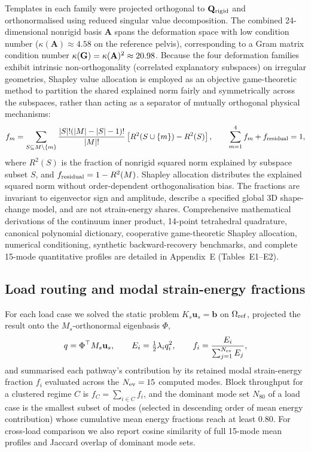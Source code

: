 \documentclass[11pt]{article}
\begin{document}
Templates in each family were projected orthogonal to $\mathbf Q_{\rm rigid}$ and orthonormalised using reduced singular value decomposition.
The combined 24-dimensional nonrigid basis $\mathbf A$ spans the deformation space with low condition number ($\kappa(\mathbf A) \approx 4.58$ on the reference pelvis), corresponding to a Gram matrix condition number $\kappa(\mathbf G) = \kappa(\mathbf A)^2 \approx 20.98$.
Because the four deformation families exhibit intrinsic non-orthogonality (correlated explanatory subspaces) on irregular geometries, Shapley value allocation is employed as an objective game-theoretic method to partition the shared explained norm fairly and symmetrically across the subspaces, rather than acting as a separator of mutually orthogonal physical mechanisms:
\begin{equation}
f_m = \sum_{S \subseteq M \setminus \{m\}} \frac{|S|!(|M|-|S|-1)!}{|M|!} \left[ R^2(S \cup \{m\}) - R^2(S) \right], \qquad
\sum_{m=1}^4 f_m + f_{\rm residual} = 1,
\end{equation}
where $R^2(S)$ is the fraction of nonrigid squared norm explained by subspace subset $S$, and $f_{\rm residual} = 1 - R^2(M)$.
Shapley allocation distributes the explained squared norm without order-dependent orthogonalisation bias.
The fractions are invariant to eigenvector sign and amplitude, describe a specified global 3D shape-change model, and are not strain-energy shares.
Comprehensive mathematical derivations of the continuum inner product, 14-point tetrahedral quadrature, canonical polynomial dictionary, cooperative game-theoretic Shapley allocation, numerical conditioning, synthetic backward-recovery benchmarks, and complete 15-mode quantitative profiles are detailed in Appendix~E (Tables~E1--E2).

\subsection{Load routing and modal strain-energy fractions}
\label{sec:routing-methods}

For each load case we solved the static problem $K_s\mathbf u_s=\mathbf b$ on $\Omega_{\rm ref}$, projected the result onto the $M_s$-orthonormal eigenbasis $\Phi$,
\begin{equation}
q=\Phi^\top M_s\mathbf u_s,\qquad E_i=\tfrac12\lambda_i q_i^2,\qquad f_i=\frac{E_i}{\sum_{j=1}^{N_{\rm ev}} E_j},
\label{eq:modal-fraction}
\end{equation}
and summarised each pathway's contribution by its retained modal strain-energy fraction $f_i$ evaluated across the $N_{\rm ev}=15$ computed modes.
Block throughput for a clustered regime $C$ is $f_C=\sum_{i\in C}f_i$, and the dominant mode set $N_{80}$ of a load case is the smallest subset of modes (selected in descending order of mean energy contribution) whose cumulative mean energy fractions reach at least 0.80.
For cross-load comparison we also report cosine similarity of full 15-mode mean profiles and Jaccard overlap of dominant mode sets.
\end{document}
